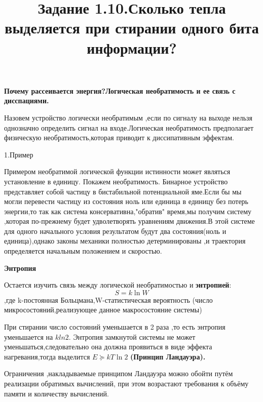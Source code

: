 \documentclass[12pt]{article}
\title{Задание 1.10.Сколько тепла выделяется при стирании одного бита информации?}
\begin{document}
 \maketitle
 \textbf{Почему рассеивается энергия?Логическая необратимость и ее связь с дисспациями.}
 
 Назовем устройство логически необратимым ,если по сигналу на выходе нельзя однозначно определить сигнал на входе.Логическая необратимость предполагает физическую необратимость,которая приводит к диссипативным эффектам.
 
 1.Пример
 
 Примером необратимой  логической функции истинности может являться установление в единицу.
 Покажем необратимость. Бинарное устройство представляет собой частицу в бистабильной потенциальной яме.Если бы мы могли перевести частицу из состояния ноль или единица в единицу без потерь энергии,то так как система консервативна,"обратив" время,мы получим систему ,которая по-прежнему будет удволетворять уравнениям движения.В этой системе для одного начального условия результатом будут два состояния(ноль и единица),однако законы механики полностью детерминированы ,и траектория определяется начальным положением и скоростью.
 
 \textbf{Энтропия}
 
 Остается изучить связь между логической необратимостью и \textbf{энтропией}:
 \begin{equation}
     S=k\ln W
 \end{equation}
 ,где k-постоянная Больцмана,W-статистическая вероятность (число микросостояний,реализующее данное макросостояние системы)
 
 При стирании число состояний уменьшается в 2 раза ,то есть энтропия уменьшается на $kln2$.
 Энтропия замкнутой системы не может уменьшаться,следовательно она должна проявиться в виде эффекта нагревания,тогда выделится $E\succeq k T \ln 2$ \textbf{(Принцип Ландауэра).}
 
 Ограничения ,накладываемые принципом Ландауэра можно обойти путём реализации обратимых вычислений, при этом возрастают требования к объёму памяти и количеству вычислений.
 
 
\end{document}
